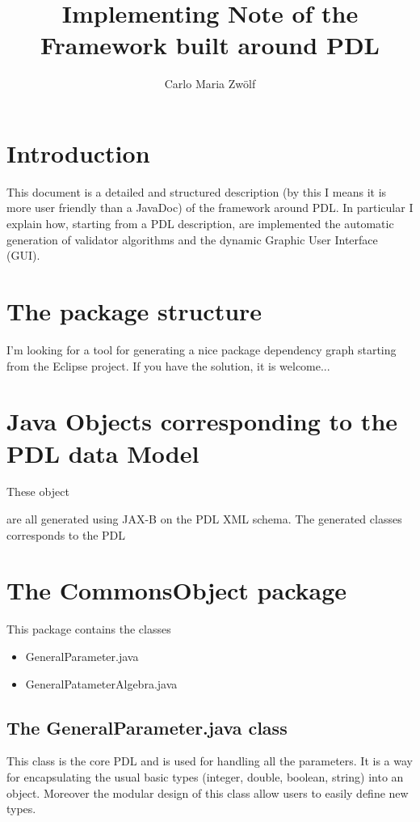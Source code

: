 \documentclass[a4paper,11pt] {ivoa}
\title{Implementing Note of the Framework built around PDL}
\author{Carlo Maria Zw\"olf}
\date{\pdldate}
\begin{document}
\maketitle

\newpage

\tableofcontents

\newpage

\section{Introduction}\label{intro}
This document is a detailed and structured description (by this I means it is more user friendly than a JavaDoc) of the framework around PDL. In particular I explain how, starting from a PDL description, are implemented the automatic generation of validator algorithms and the dynamic Graphic User Interface (GUI). 

\section{The package structure}
I'm looking for a tool for generating a nice package dependency graph starting from the Eclipse project. If you have the solution, it is welcome...

\section{Java Objects corresponding to the PDL data Model}\label{Java_Objects}
These object 


are all generated using JAX-B on the PDL XML schema. The generated classes corresponds to the PDL 


\section{The CommonsObject package}\label{commons}
This package contains the classes 
\begin{itemize}
\item GeneralParameter.java
\item GeneralPatameterAlgebra.java
\end{itemize}

\subsection{The  GeneralParameter.java class }\label{generalParameter}
This class is the core PDL and is used for handling all the parameters. It is a way for encapsulating the usual basic types (integer, double, boolean, string) into an object. Moreover the modular design of this class allow users to easily define new types.\\
\end{document}
